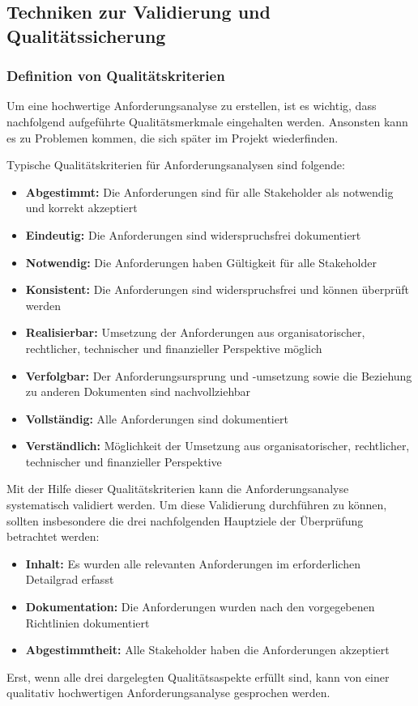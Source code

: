 \subsection{Techniken zur Validierung und Qualitätssicherung}
\subsubsection{Definition von Qualitätskriterien}
Um eine hochwertige Anforderungsanalyse zu erstellen, ist es wichtig, dass nachfolgend aufgeführte Qualitätsmerkmale eingehalten werden.
Ansonsten kann es zu Problemen kommen, die sich später im Projekt wiederfinden.

Typische Qualitätskriterien für Anforderungsanalysen sind folgende:
\begin{itemize}
    \item \textbf{Abgestimmt:} Die Anforderungen sind für alle Stakeholder als notwendig und korrekt akzeptiert
    \item \textbf{Eindeutig:} Die Anforderungen sind widerspruchsfrei dokumentiert
    \item \textbf{Notwendig:} Die Anforderungen haben Gültigkeit für alle Stakeholder
    \item \textbf{Konsistent:} Die Anforderungen sind widerspruchsfrei und können überprüft werden
    \item \textbf{Realisierbar:} Umsetzung der Anforderungen aus organisatorischer, rechtlicher, technischer und finanzieller Perspektive möglich
    \item \textbf{Verfolgbar:} Der Anforderungsursprung und -umsetzung sowie die Beziehung zu anderen Dokumenten sind nachvollziehbar
    \item \textbf{Vollständig:} Alle Anforderungen sind dokumentiert
    \item \textbf{Verständlich:} Möglichkeit der Umsetzung aus organisatorischer, rechtlicher, technischer und finanzieller Perspektive
\end{itemize}\autocite[vgl.][Seite 44]{Maulhardt.b}

Mit der Hilfe dieser Qualitätskriterien kann die Anforderungsanalyse systematisch validiert werden.
Um diese Validierung durchführen zu können, sollten insbesondere die drei nachfolgenden Hauptziele der Überprüfung betrachtet werden:
\begin{itemize}
    \item \textbf{Inhalt:} Es wurden alle relevanten Anforderungen im erforderlichen Detailgrad erfasst
    \item \textbf{Dokumentation:} Die Anforderungen wurden nach den vorgegebenen Richtlinien dokumentiert
    \item \textbf{Abgestimmtheit:} Alle Stakeholder haben die Anforderungen akzeptiert
\end{itemize}
Erst, wenn alle drei dargelegten Qualitätsaspekte erfüllt sind, kann von einer qualitativ hochwertigen Anforderungsanalyse gesprochen werden\autocite[vgl.][Seite 16ff]{Maulhardt.c}.

